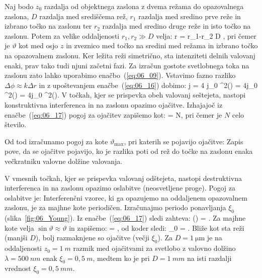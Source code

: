 Naj bodo $z_0$ razdalja od objektnega zaslona z dvema režama 
do opazovalnega zaslona, $D$ razdalja med središčema rež, 
$r_1$ razdalja med sredino prve reže in izbrano točko na zaslonu
ter $r_2$ razdalja med sredino druge reže in isto točko na zaslonu. Potem za velike 
oddaljenosti $r_1, r_2 \gg D$ velja:
\beq
\Delta r = r_1-r_2 \approx D \sin\vartheta,
\label{eq:06_16}
\eeq
pri čemer je $\vartheta$ kot med osjo $z$ in zveznico med točko na sredini med režama in
izbrano točko na opazovalnem zaslonu. Ker ležita reži simetrično, sta intenziteti delnih
valovanj enaki, prav tako tudi njuni začetni fazi. Za izračun gostote svetlobnega toka na zaslonu 
zato lahko uporabimo enačbo~(\ref{eq:06_09}). Vstavimo fazno razliko $\Delta \phi \approx 
k\Delta r$ in z upoštevanjem enačbe~(\ref{eq:06_16}) dobimo:
\beq
j = 4 j_0 \cos^2\left(\right) = 4j_0 \cos^2\left(\right) = 
4j_0 \cos^2\left(\right)\!\!.
\label{eq:06_17}
\eeq
V točkah, kjer se prispevka obeh valovanj seštejeta, nastopi 
konstruktivna interferenca in na zaslonu opazimo ojačitve. 
Izhajajoč iz enačbe~(\ref{eq:06_17}) pogoj za ojačitev zapišemo kot:
\beq
{} = N\pi,
\label{eq:06_18}
\eeq
pri čemer je $N$ celo število. 

Od tod izračunamo pogoj za kote $\vartheta_\mathrm{max}$, pri katerih
se pojavijo ojačitve:
Zapis pove, da se ojačitve pojavijo, ko je razlika poti od rež 
do točke na zaslonu enaka večkratniku valovne dolžine valovanja.

V vmesnih točkah, kjer se prispevka valovanj odštejeta, nastopi 
destruktivna interferenca in na zaslonu opazimo oslabitve (neosvetljene proge). 
Pogoj za oslabitve je:
Interferenčni vzorec, ki ga opazujemo na oddaljenem opazovalnem zaslonu, je za majhne 
kote periodičen. Izračunajmo periodo ponavljanja $\xi_0$ (slika~\ref{fig:06_Young}). 
Iz enačbe~(\ref{eq:06_17}) sledi zahteva:
\beq
\Delta \left(\right) = \pi.
\label{eq:06_19}
\eeq
Za majhne kote velja $\sin \vartheta \approx \vartheta$ in zapišemo: 
\beq
{} \approx {}
 \approx {} = \pi,
\label{eq:06_20}
\eeq
od koder sledi:
\beq
\xi_0 = .
\label{eq:06_21}
\eeq
Bliže kot sta reži (manjši $D$), bolj razmaknjene so ojačitve (večji $\xi_0$). 
Za $D=1~\si{\micro\metre}$ je na oddaljenosti $z_0 = 1~\si{m}$ razmik med ojačitvami za 
svetlobo z valovno dolžino $\lambda  = 500~\si{nm}$ enak $\xi_0 = 0,5~\si{m}$, 
medtem ko je pri $D = 1~\si{mm}$ na isti razdalji vrednost $\xi_0 = 0,5~\si{mm}$. 

